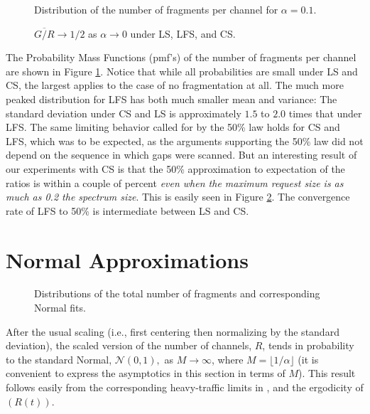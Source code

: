 \documentclass{amsart}
\begin{document}
\begin{figure}[!t]
\begin{center}
 \caption{Distribution of the number of fragments per channel for $\alpha = 0.1$.}
 \label{dist-fragper}
\end{center}
\end{figure}


\begin{figure}[!t]
\begin{center}
 \caption{ $\overline{G/R} \rightarrow 1/2$
 as $\alpha \rightarrow 0$ under LS, LFS, and CS.}
 \label{fifty-law-ls-cs}
\end{center}
\end{figure}
The Probability Mass Functions (pmf's) of the number of fragments per channel are shown in Figure \ref{dist-fragper}.
Notice that while all probabilities are small under LS and CS, the largest applies to the case of no fragmentation at all.  The much more peaked distribution for LFS has both  much smaller mean and variance:  The standard deviation under CS and LS is approximately $1.5$ to $2.0$ times that under LFS.
The same limiting behavior called for by the 50\% law holds for CS
and LFS, which was to be expected, as the arguments supporting the
50\% law did not depend on the sequence in which gaps were scanned.
But an interesting result of our experiments with CS is that the
50\% approximation to expectation of the ratios  is within a couple
of percent {\em even when the maximum request size is as much as 0.2
the spectrum size}. This is easily seen in Figure
\ref{fifty-law-ls-cs}.  The convergence rate of LFS to 50\% is intermediate between LS and CS.



\section{Normal Approximations}\label{sec:normal}

\begin{figure}[!t]
\begin{center}
  \caption{Distributions of the total number of fragments and corresponding Normal fits.}
  \label{normal-fits-num-frags}
\end{center}
\end{figure}
After the usual scaling (i.e.,
first centering then normalizing by the standard deviation), the
scaled version of the number of channels, $R$, tends in
probability to the standard Normal, ${\mathcal{N}}(0,1),$ as $M
\rightarrow \infty$, where $M = \lfloor 1/\alpha \rfloor$ (it is convenient to express the asymptotics in this section in terms
of $M$). This result follows easily from the
corresponding heavy-traffic limits in
\cite{CoffmanPuhalskiiReiman1991, CoffmanReiman1983}, and the
ergodicity of $(R(t))$.
\end{document}

